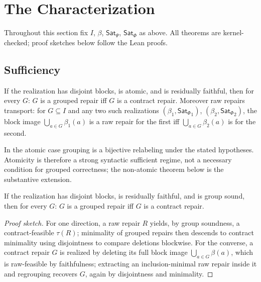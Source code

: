\documentclass[sigplan,10pt,review,anonymous]{acmart}
\theoremstyle{acmdefinition}
\newcommand{\SatPsi}{{\mathsf{Sat}_\Psi}}
\newcommand{\SatPhi}{{\mathsf{Sat}_\Phi}}
\begin{document}
\section{The Characterization}
\label{sec:char}

Throughout this section fix $I$, $\beta$, $\SatPsi$, $\SatPhi$ as above. All
theorems are kernel-checked; proof sketches below follow the Lean proofs.

\subsection{Sufficiency}

\begin{theorem}
\label{thm:atomic}
If the realization has disjoint blocks, is atomic, and is residually
faithful, then for every $G$: $G$ is a grouped repair iff $G$ is a contract
repair. Moreover raw repairs transport: for $G \subseteq I$ and any two such
realizations $(\beta_1,\SatPhi_1)$, $(\beta_2,\SatPhi_2)$, the block image
$\bigcup_{a\in G}\beta_1(a)$ is a raw repair for the first iff
$\bigcup_{a\in G}\beta_2(a)$ is for the second.
\end{theorem}

In the atomic case grouping is a bijective relabeling under the stated
hypotheses. Atomicity is therefore a strong syntactic sufficient regime, not a
necessary condition for grouped correctness; the non-atomic theorem below is
the substantive extension.

\begin{theorem}
\label{thm:suff}
If the realization has disjoint blocks, is residually faithful, and is group
sound, then for every $G$: $G$ is a grouped repair iff $G$ is a contract
repair.
\end{theorem}

\begin{proof}[Proof sketch]
For one direction, a raw repair $R$ yields, by group soundness, a
contract-feasible $\tau(R)$; minimality of grouped repairs then descends to
contract minimality using disjointness to compare deletions blockwise. For
the converse, a contract repair $G$ is realized by deleting its full block
image $\bigcup_{a \in G}\beta(a)$, which is raw-feasible by faithfulness;
extracting an inclusion-minimal raw repair inside it and regrouping recovers
$G$, again by disjointness and minimality.
\end{proof}
\end{document}
